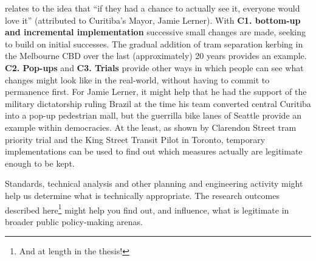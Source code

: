 \documentclass{tufte-handout}
\begin{document}
 relates to the idea that “if they had a chance to actually see it, everyone would love it” (attributed to Curitiba's Mayor, Jamie Lerner\cite{McKibben:2007aa}). With \textbf{C1. bottom-up and incremental implementation} successive small changes are made, seeking to build on initial successes. The gradual addition of tram separation kerbing in the Melbourne CBD over the last (approximately) 20 years provides an example. \textbf{C2. Pop-ups} and \textbf{C3. Trials} provide other ways in which people can see what changes might look like in the real-world, without having to commit to permanence first.  For Jamie Lerner, it might help that he had the support of the military dictatorship ruling Brazil at the time his team converted central Curitiba into a pop-up pedestrian mall, but the guerrilla bike lanes of Seattle\cite{Fucoloro:2013aa} provide an example within democracies. At the least, as shown by Clarendon Street tram priority trial\cite{Silkstone:2005aa} and the King Street Transit Pilot in Toronto, temporary implementations can be used to find out which measures actually are legitimate enough to be kept.

Standards, technical analysis and other planning and engineering activity might help us determine what is technically appropriate. The research outcomes described here\footnote{And at length in the thesis!} might help you find out, and influence, what is legitimate in broader public policy-making arenas. 


\end{document}
